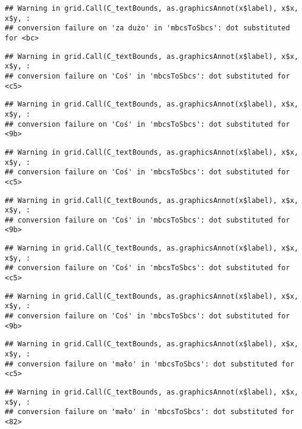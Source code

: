 \documentclass[
]{book}
\begin{document}
\begin{verbatim}
## Warning in grid.Call(C_textBounds, as.graphicsAnnot(x$label), x$x, x$y, :
## conversion failure on 'za dużo' in 'mbcsToSbcs': dot substituted for <bc>
\end{verbatim}

\begin{verbatim}
## Warning in grid.Call(C_textBounds, as.graphicsAnnot(x$label), x$x, x$y, :
## conversion failure on 'Coś' in 'mbcsToSbcs': dot substituted for <c5>
\end{verbatim}

\begin{verbatim}
## Warning in grid.Call(C_textBounds, as.graphicsAnnot(x$label), x$x, x$y, :
## conversion failure on 'Coś' in 'mbcsToSbcs': dot substituted for <9b>
\end{verbatim}

\begin{verbatim}
## Warning in grid.Call(C_textBounds, as.graphicsAnnot(x$label), x$x, x$y, :
## conversion failure on 'Coś' in 'mbcsToSbcs': dot substituted for <c5>
\end{verbatim}

\begin{verbatim}
## Warning in grid.Call(C_textBounds, as.graphicsAnnot(x$label), x$x, x$y, :
## conversion failure on 'Coś' in 'mbcsToSbcs': dot substituted for <9b>
\end{verbatim}

\begin{verbatim}
## Warning in grid.Call(C_textBounds, as.graphicsAnnot(x$label), x$x, x$y, :
## conversion failure on 'Coś' in 'mbcsToSbcs': dot substituted for <c5>
\end{verbatim}

\begin{verbatim}
## Warning in grid.Call(C_textBounds, as.graphicsAnnot(x$label), x$x, x$y, :
## conversion failure on 'Coś' in 'mbcsToSbcs': dot substituted for <9b>
\end{verbatim}

\begin{verbatim}
## Warning in grid.Call(C_textBounds, as.graphicsAnnot(x$label), x$x, x$y, :
## conversion failure on 'mało' in 'mbcsToSbcs': dot substituted for <c5>
\end{verbatim}

\begin{verbatim}
## Warning in grid.Call(C_textBounds, as.graphicsAnnot(x$label), x$x, x$y, :
## conversion failure on 'mało' in 'mbcsToSbcs': dot substituted for <82>
\end{verbatim}
\end{document}
